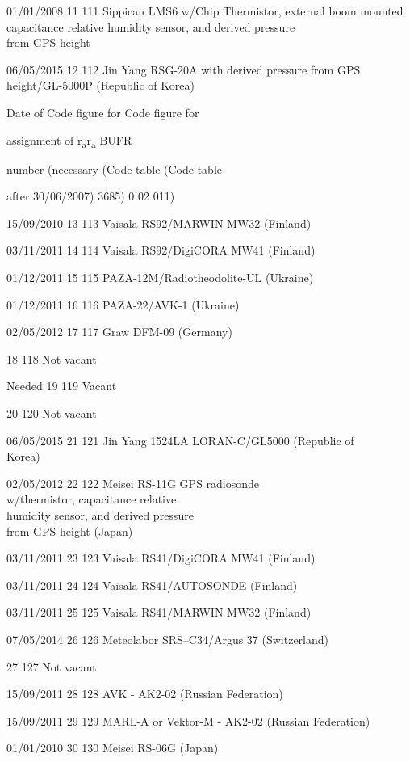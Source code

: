 01/01/2008 11 111 Sippican LMS6 w/Chip Thermistor, external boom mounted\\
capacitance relative humidity sensor, and derived pressure\\
from GPS height

06/05/2015 12 112 Jin Yang RSG-20A with derived pressure from GPS\\
height/GL-5000P (Republic of Korea)

Date of Code figure for Code figure for

assignment of r\textsubscript{a}r\textsubscript{a} BUFR

number (necessary (Code table (Code table

after 30/06/2007) 3685) 0 02 011)

15/09/2010 13 113 Vaisala RS92/MARWIN MW32 (Finland)

03/11/2011 14 114 Vaisala RS92/DigiCORA MW41 (Finland)

01/12/2011 15 115 PAZA-12M/Radiotheodolite-UL (Ukraine)

01/12/2011 16 116 PAZA-22/AVK-1 (Ukraine)

02/05/2012 17 117 Graw DFM-09 (Germany)

18 118 Not vacant

Needed 19 119 Vacant

20 120 Not vacant

06/05/2015 21 121 Jin Yang 1524LA LORAN-C/GL5000 (Republic of\\
Korea)

02/05/2012 22 122 Meisei RS-11G GPS radiosonde\\
w/thermistor, capacitance relative\\
humidity sensor, and derived pressure\\
from GPS height (Japan)

03/11/2011 23 123 Vaisala RS41/DigiCORA MW41 (Finland)

03/11/2011 24 124 Vaisala RS41/AUTOSONDE (Finland)

03/11/2011 25 125 Vaisala RS41/MARWIN MW32 (Finland)

07/05/2014 26 126 Meteolabor SRS--C34/Argus 37 (Switzerland)

27 127 Not vacant

15/09/2011 28 128 AVK - AK2-02 (Russian Federation)

15/09/2011 29 129 MARL-A or Vektor-M - AK2-02 (Russian Federation)

01/01/2010 30 130 Meisei RS-06G (Japan)

